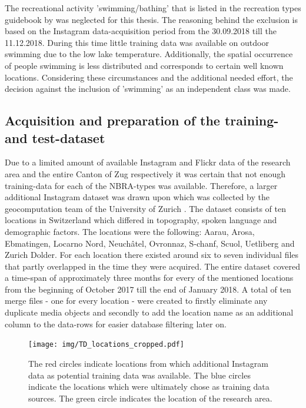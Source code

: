 \newline
The recreational activity 'swimming/bathing' that is listed in the recreation types guidebook by \textcite{IFL2018} was neglected for this thesis. The reasoning behind the exclusion is based on the Instagram data-acquisition period from the 30.09.2018 till the 11.12.2018. During this time little training data was available on outdoor swimming due to the low lake temperature. Additionally, the spatial occurrence of people swimming is less distributed and corresponds to certain well known locations. Considering these circumstances and the additional needed effort, the decision against the inclusion of 'swimming' as an independent class was made.

\subsection{Acquisition and preparation of the training- and test-dataset} \label{preparation_training_data}
Due to a limited amount of available Instagram and Flickr data of the research area and the entire Canton of Zug respectively it was certain that not enough training-data for each of the NBRA-types was available. Therefore, a larger additional Instagram dataset was drawn upon which was collected by the geocomputation team of the University of Zurich \parencite{Gruzd2016}. The dataset consists of ten locations in Switzerland which differed in topography, spoken language and demographic factors. The locations were the following: Aarau, Arosa, Ebmatingen, Locarno Nord, Neuch\^{a}tel, Ovronnaz, S-chanf, Scuol, Uetliberg and Zurich Dolder. For each location there existed around six to seven individual files that partly overlapped in the time they were acquired. The entire dataset covered a time-span of approximately three months for every of the mentioned locations from the beginning of October 2017 till the end of January 2018. A total of ten merge files - one for every location - were created to firstly eliminate any duplicate media objects and secondly to add the location name as an additional column to the data-rows for easier database filtering later on.\\

\begin{figure}[h]
   \centering
   \texttt{[image: img/TD\_locations\_cropped.pdf]}
   \caption{The red circles indicate locations from which additional Instagram data as potential training data was available. The blue circles indicate the locations which were ultimately chose as training data sources. The green circle indicates the location of the research area.}
   \label{fig:TD_locations}
\end{figure}


